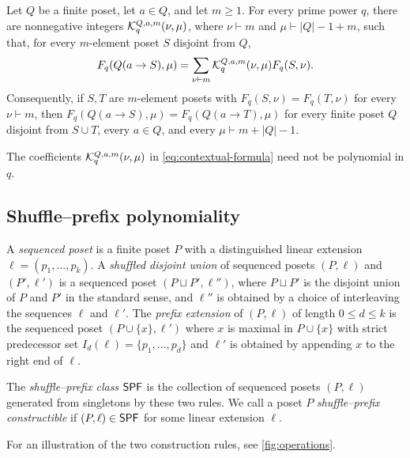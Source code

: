 \begin{theorem}
\label{thm:contextual-formula}\label{cor:profile-replacement}
Let $Q$ be a finite poset, let $a\in Q$, and let $m\geq1$.
For every prime power $q$, there are nonnegative integers
$\mathcal K_q^{Q,a,m}(\nu,\mu)$, where $\nu\vdash m$ and $\mu\vdash |Q|-1+m$,
{such that, for every
$m$-element poset $S$ disjoint from $Q$,}
\begin{equation}
 F_q(Q(a\to S),\mu)=\sum_{\nu\vdash m}
       \mathcal K_q^{Q,a,m}(\nu,\mu)F_q(S,\nu).
 \label{eq:contextual-formula}
\end{equation}
{Consequently, if $S,T$ are $m$-element posets with
$F_q(S,\nu)=F_q(T,\nu)$ for every $\nu\vdash m$, then
$F_q(Q(a\to S),\mu)=F_q(Q(a\to T),\mu)$ for every finite poset $Q$
disjoint from $S\cup T$, every $a\in Q$, and every
$\mu\vdash m+|Q|-1$.}
\end{theorem}

The coefficients {$\mathcal K_q^{Q,a,m}(\nu,\mu)$}
in \eqref{eq:contextual-formula} need not be
polynomial in $q$.

\subsection{Shuffle--prefix polynomiality}
\begin{definition}
\label{def:operations}\label{def:class}
A \emph{sequenced poset} is a finite poset $P$ with a distinguished linear
extension $\ell=(p_1,\ldots,p_k)$. 
{ A \emph{shuffled disjoint union} 
	of sequenced posets $(P,\ell)$ and $(P',\ell')$
	is a sequenced poset $(P\sqcup P',\ell'')$, where $P\sqcup P'$ is the disjoint union of $P$ and $P'$ in the standard sense, and $\ell''$ is obtained by a choice of interleaving the sequences $\ell$ and $\ell'$. The \emph{prefix extension} of $(P,\ell)$ of length $0\leq d\leq k$ is the sequenced poset $(P\cup\{x\},\ell')$ where $x$ is maximal in $P\cup\{x\}$ with strict predecessor set $I_d(\ell)=\{p_1,\ldots,p_d\}$ and $\ell'$ is obtained by appending $x$ to the right end of $\ell$.}

The \emph{shuffle--prefix class} $\mathsf{SPF}$ is { the collection of sequenced posets $(P,\ell)$ generated from singletons by
these two rules.} {We call a poset $P$ \emph{shuffle--prefix constructible} if $(P,\ell)\in\mathsf{SPF}$ for some linear extension $\ell$.}
\end{definition}

{For an illustration of the two construction rules, see \cref{fig:operations}.}

